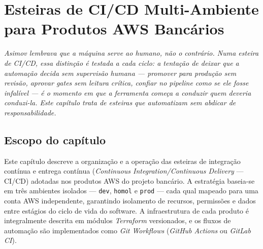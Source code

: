 \chapter{Esteiras de CI/CD Multi-Ambiente para Produtos AWS Banc\'arios}
\label{chap:cicd_multiambiente_bancario}

{\small\itshape\color{AccentGray}
Asimov lembrava que a m\'{a}quina serve ao humano, n\~ao o contr\'{a}rio. Numa esteira de CI/CD, essa distin\c{c}\~ao \'{e} testada a cada ciclo: a tenta\c{c}\~ao de deixar que a automa\c{c}\~ao decida sem supervis\~ao humana --- promover para produ\c{c}\~ao sem revis\~ao, aprovar \textit{gates} sem leitura cr\'{i}tica, confiar no pipeline como se ele fosse infalível --- \'{e} o momento em que a ferramenta come\c{c}a a conduzir quem deveria conduzi-la. Este cap\'{i}tulo trata de esteiras que automatizam sem abdicar de responsabilidade.\par}
\vspace{0.6em}
\section{Escopo do cap\'itulo}

Este cap\'itulo descreve a organiza\c{c}\~ao e a opera\c{c}\~ao das
esteiras de integra\c{c}\~ao cont\'inua e entrega cont\'inua
(\textit{Continuous Integration/Continuous Delivery} --- CI/CD) adotadas
nos produtos AWS do projeto bancário. A estratégia baseia-se em
tr\^es ambientes isolados --- \texttt{dev},
\texttt{homol} e \texttt{prod} ---
cada qual mapeado para uma conta AWS independente,
garantindo isolamento de recursos, permiss\~oes e dados entre est\'agios do
ciclo de vida do software. A infraestrutura de cada produto \'e integralmente
descrita em m\'odulos \textit{Terraform} versionados, e os
fluxos de automa\c{c}\~ao s\~ao implementados como
\textit{Git Workflows}
(\textit{GitHub Actions} ou \textit{GitLab CI}).

